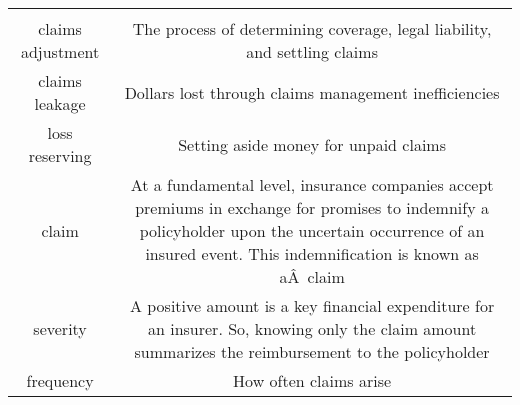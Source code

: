 \documentclass[]{book}
\theoremstyle{definition}
\theoremstyle{definition}
\theoremstyle{definition}
\theoremstyle{remark}
\begin{document}
\begin{longtable}[]{@{}cc@{}}
\begin{minipage}[t]{0.42\columnwidth}
\end{minipage}\tabularnewline
\begin{minipage}[t]{0.41\columnwidth}\centering\strut
claims adjustment\strut
\end{minipage} & \begin{minipage}[t]{0.42\columnwidth}\centering\strut
The process of determining coverage, legal liability, and settling
claims\strut
\end{minipage}\tabularnewline
\begin{minipage}[t]{0.41\columnwidth}\centering\strut
claims leakage\strut
\end{minipage} & \begin{minipage}[t]{0.42\columnwidth}\centering\strut
Dollars lost through claims management inefficiencies\strut
\end{minipage}\tabularnewline
\begin{minipage}[t]{0.41\columnwidth}\centering\strut
loss reserving\strut
\end{minipage} & \begin{minipage}[t]{0.42\columnwidth}\centering\strut
Setting aside money for unpaid claims\strut
\end{minipage}\tabularnewline
\begin{minipage}[t]{0.41\columnwidth}\centering\strut
claim\strut
\end{minipage} & \begin{minipage}[t]{0.42\columnwidth}\centering\strut
At a fundamental level, insurance companies accept premiums in exchange
for promises to indemnify a policyholder upon the uncertain occurrence
of an insured event. This indemnification is known as aÂ~claim\strut
\end{minipage}\tabularnewline
\begin{minipage}[t]{0.41\columnwidth}\centering\strut
severity\strut
\end{minipage} & \begin{minipage}[t]{0.42\columnwidth}\centering\strut
A positive amount is a key financial expenditure for an insurer. So,
knowing only the claim amount summarizes the reimbursement to the
policyholder\strut
\end{minipage}\tabularnewline
\begin{minipage}[t]{0.41\columnwidth}\centering\strut
frequency\strut
\end{minipage} & \begin{minipage}[t]{0.42\columnwidth}\centering\strut
How often claims arise\strut
\end{minipage}\tabularnewline

\end{longtable}
\end{document}
